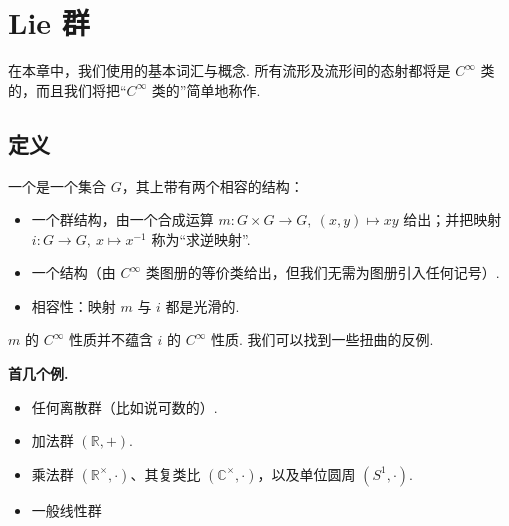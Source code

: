 \chapter{Lie 群}\label{chap:lie-1}

在本章中，我们使用的基本词汇与概念. 所有流形及流形间的态射都将是 $C^{\infty}$ 类的，而且我们将把``$C^{\infty}$ 类的''简单地称作.

\section{定义}\label{sec:lie-1-1}

\begin{definition}\label{def:lie-1-1-1}
一个是一个集合 $G$，其上带有两个相容的结构：
\begin{itemize}[label=--]
\item 一个群结构，由一个合成运算 $m:G\times G\longrightarrow G,\ (x,y)\mapsto xy$ 给出；并把映射 $i:G\longrightarrow G,\ x\mapsto x^{-1}$ 称为``求逆映射''.
\item 一个结构（由 $C^{\infty}$ 类图册的等价类给出，但我们无需为图册引入任何记号）.
\item 相容性：映射 $m$ 与 $i$ 都是光滑的.
\end{itemize}
\end{definition}

\begin{remark*}
$m$ 的 $C^{\infty}$ 性质并不蕴含 $i$ 的 $C^{\infty}$ 性质. 我们可以找到一些扭曲的反例.
\end{remark*}

\noindent\textbf{首几个例.}
\begin{itemize}[label=--]
\item 任何离散群（比如说可数的）.
\item 加法群 $(\mathbb{R},+)$.
\item 乘法群 $(\mathbb{R}^{\times},\cdot)$、其复类比 $(\mathbb{C}^{\times},\cdot)$，以及单位圆周 $(S^{1},\cdot)$.
\item 一般线性群
\end{itemize}

